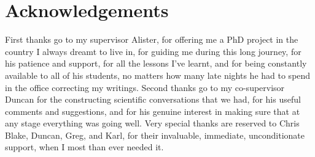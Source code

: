\chapter*{Acknowledgements}

First thanks go to my supervisor Alister, 
for offering me a PhD project in the country I always dreamt to live in, 
for guiding me during this long journey, 
for his patience and support, 
for all the lessons I've learnt, 
and for being constantly available to all of his students, 
no matters how many late nights he had to spend in the office correcting my writings. 
Second thanks go to my co-supervisor Duncan for the constructing scientific conversations that we had, 
for his useful comments and suggestions, 
and for his genuine interest in making sure that at any stage everything was going well. 
Very special thanks are reserved to Chris Blake, Duncan, Greg, and Karl, 
for their invaluable, immediate, unconditionate support, when I most than ever needed it. 

%
%
%
